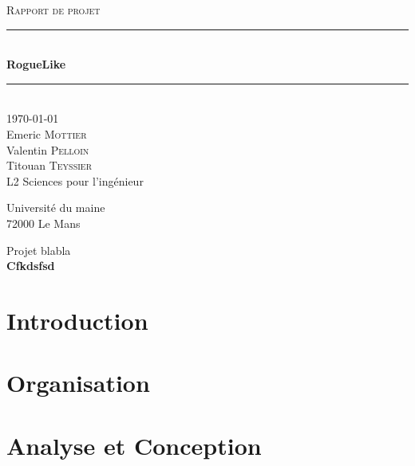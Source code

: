 \documentclass[12pt]{report}
\begin{document}
\begin{titlepage}
	
	\newcommand{\HRule}{\rule{\linewidth}{0.5mm}}
	\center
	
	\textsc{\LARGE Rapport de projet}\\[1.5cm]
	
	\HRule \\[0.4cm]
	{ \huge \bfseries RogueLike}\\[0.4cm]
	\HRule \\[1.5cm]
	 
	{\large \today}\\[1cm]
	

	Emeric \textsc{Mottier}\\
	Valentin \textsc{Pelloin}\\
	Titouan \textsc{Teyssier}\\
	L2 Sciences pour l'ingénieur
	
	Université du maine\\
	72000 Le Mans

	\large Projet blabla\\[0.5cm]
	
	
	{ \large \bfseries Cfkdsfsd}\\[0.4cm]
	
	\vfill
\end{titlepage}

\tableofcontents

\chapter{Introduction}

\chapter{Organisation}

\chapter{Analyse et Conception}
\end{document}
